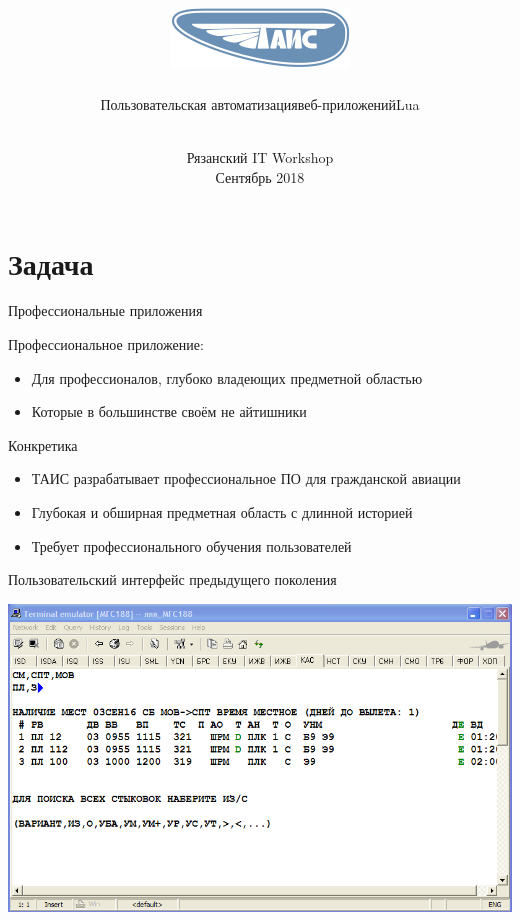 \documentclass[aspectratio=169,handout,bigger]{beamer}
\title{\includegraphics[height=.15\textheight]{logo}}
\author{Пользовательская автоматизация\newlineпрофессиональных веб-приложений\newlineна Lua}
\institute{Александр Гладыш\newline@agladysh}
\date{\\Рязанский IT Workshop\\Сентябрь 2018}
\begin{document}
\maketitle


\section{Задача}


\begin{frame}{Профессиональные приложения}

Профессиональное приложение:

\begin{itemize}
\item Для профессионалов, глубоко владеющих предметной областью
\item Которые в большинстве своём не айтишники
\end{itemize}

\end{frame}


\begin{frame}{Конкретика}

\begin{itemize}
\item ТАИС разрабатывает профессиональное ПО для гражданской авиации
\item Глубокая и обширная предметная область с длинной историей
\item Требует профессионального обучения пользователей
\end{itemize}

\end{frame}


\begin{frame}{Пользовательский интерфейс предыдущего поколения}

\includegraphics[width=.90\textwidth]{temul}

\end{frame}
\end{document}
